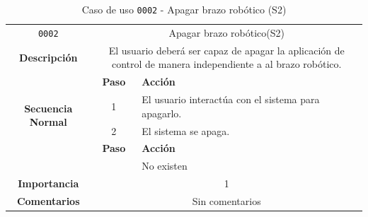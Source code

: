\begin{table}[H]
    \centering
    \begin{tabularx}{\textwidth}{|c|c|X|}
        \cline{1-3}
        \texttt{0002}                              & \multicolumn{2}{c|}{Apagar brazo robótico(S2)}                                                                                                                      \\ \cline{1-3}
        \textbf{Descripción}                       & \multicolumn{2}{m{13cm}|}{El usuario deberá ser capaz de apagar la aplicación de control de manera independiente a al brazo robótico.}
        \\ \cline{1-3}
        \multirow{4}{*}{\textbf{Secuencia Normal}} & \textbf{Paso}                                                                                                                                        & \textbf{Acción}
        \\ \cline{2-3}                    &   1  & El usuario interactúa con el sistema para apagarlo.
        \\ \cline{2-3}                    &   2  & El sistema se apaga.
        \\ \cline{1-3}
        \multirow{2}{*}{\textbf{Excepciones}}      & \textbf{Paso}                                                                                                                                        & \textbf{Acción}
        \\ \cline{2-3}                    &     & No existen
        \\ \cline{1-3}
        \textbf{Importancia}                       & \multicolumn{2}{c|}{1}                                                                                                                                                 \\ \cline{1-3}
        \textbf{Comentarios}                       & \multicolumn{2}{c|}{Sin comentarios}                                                                                                                                   \\ \cline{1-3}
    \end{tabularx}
    \caption{Caso de uso \texttt{0002} - Apagar brazo robótico (S2)}
\end{table}


